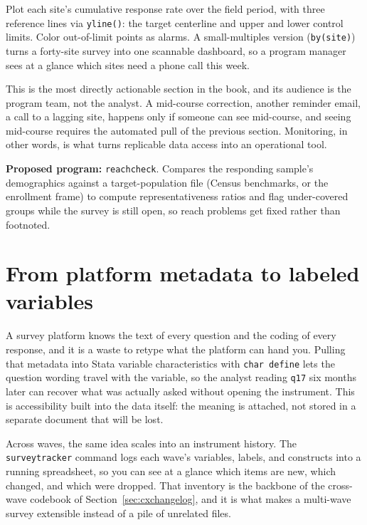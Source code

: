 \documentclass[
    a4paper,
    fontsize=10pt,
    twoside=true,
    numbers=noenddot,
]{kaobook}
\newenvironment{vizcallout}[1][Visualization to build]{%
    \begin{vizbox}[frametitle={#1}]%
}{%
    \end{vizbox}%
}
\begin{document}
\begin{vizcallout}[Visualization to build: the response-rate control chart]
Plot each site's cumulative response rate over the field period, with three reference lines via \texttt{yline()}: the target centerline and upper and lower control limits. Color out-of-limit points as alarms. A small-multiples version (\texttt{by(site)}) turns a forty-site survey into one scannable dashboard, so a program manager sees at a glance which sites need a phone call this week.
\end{vizcallout}

This is the most directly actionable section in the book, and its audience is the program team, not the analyst. A mid-course correction, another reminder email, a call to a lagging site, happens only if someone can see mid-course, and seeing mid-course requires the automated pull of the previous section. Monitoring, in other words, is what turns replicable data access into an operational tool.

\begin{kaobox}[frametitle=Ado-file Idea: \texttt{reachcheck}]
\textbf{Proposed program:} \texttt{reachcheck}. Compares the responding sample's demographics against a target-population file (Census benchmarks, or the enrollment frame) to compute representativeness ratios and flag under-covered groups while the survey is still open, so reach problems get fixed rather than footnoted.
\end{kaobox}

\section{From platform metadata to labeled variables}
A survey platform knows the text of every question and the coding of every response, and it is a waste to retype what the platform can hand you. Pulling that metadata into Stata variable characteristics with \texttt{char define} lets the question wording travel with the variable, so the analyst reading \texttt{q17} six months later can recover what was actually asked without opening the instrument. This is accessibility built into the data itself: the meaning is attached, not stored in a separate document that will be lost.

Across waves, the same idea scales into an instrument history. The \texttt{surveytracker} command logs each wave's variables, labels, and constructs into a running spreadsheet, so you can see at a glance which items are new, which changed, and which were dropped. That inventory is the backbone of the cross-wave codebook of Section~\ref{sec:cxchangelog}, and it is what makes a multi-wave survey extensible instead of a pile of unrelated files.
\end{document}
